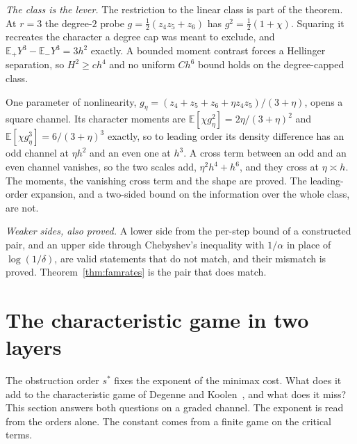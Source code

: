 \emph{The class is the lever.} The restriction to the linear class is part of the theorem. At
$r=3$ the degree-$2$ probe $g=\frac12(z_{4}z_{5}+z_{6})$ has $g^{2}=\frac12(1+\chi)$. Squaring it
recreates the character a degree cap was meant to exclude, and
$\mathbb{E}_{+}Y^{3}-\mathbb{E}_{-}Y^{3}=3h^{2}$ exactly. \CERT{} A bounded moment contrast forces a
Hellinger separation, so $H^{2}\ge ch^{4}$ and no uniform $Ch^{6}$ bound holds on the
degree-capped class.

 One parameter of nonlinearity,
$g_{\eta}=(z_{4}+z_{5}+z_{6}+\eta z_{4}z_{5})/(3+\eta)$, opens a square channel. Its character
moments are $\mathbb{E}[\chi g_{\eta}^{2}]=2\eta/(3+\eta)^{2}$ and $\mathbb{E}[\chi g_{\eta}^{3}]=6/(3+\eta)^{3}$
exactly, so to leading order its density difference has an odd channel at $\eta h^{2}$ and an
even one at $h^{3}$. A cross term between an odd and an even channel vanishes, so the two
scales add, $\eta^{2}h^{4}+h^{6}$, and they cross at $\eta\asymp h$. The moments, the vanishing cross
term and the shape are proved. The leading-order expansion, and a two-sided bound on the
information over the whole class, are not.


\emph{Weaker sides, also proved.} A lower side from the per-step bound of a constructed pair,
and an upper side through Chebyshev's inequality with $1/\alpha$ in place of $\log(1/\delta)$,
are valid statements that do not match, and their mismatch is proved.
Theorem~\ref{thm:famrates} is the pair that does match.


\section{The characteristic game in two layers}
\label{sec:twolayer}

The obstruction order $s^*$ fixes the exponent of the minimax cost. What does it add to the
characteristic game of Degenne and Koolen~\cite{degenne2019}, and what does it miss? This
section answers both questions on a graded channel. The exponent is read from the orders
alone. The constant comes from a finite game on the critical terms.


